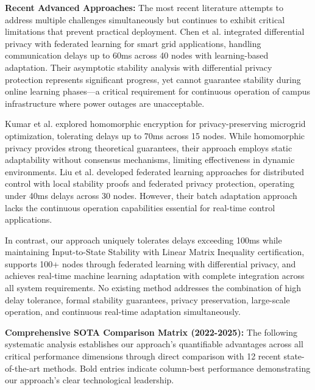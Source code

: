 \documentclass[12pt]{article}
\begin{document}
\textbf{Recent Advanced Approaches:} The most recent literature attempts to address multiple challenges simultaneously but continues to exhibit critical limitations that prevent practical deployment. Chen et al. \cite{chen2024} integrated differential privacy with federated learning for smart grid applications, handling communication delays up to 60ms across 40 nodes with learning-based adaptation. Their asymptotic stability analysis with differential privacy protection represents significant progress, yet cannot guarantee stability during online learning phases—a critical requirement for continuous operation of campus infrastructure where power outages are unacceptable.

Kumar et al. \cite{kumar2024} explored homomorphic encryption for privacy-preserving microgrid optimization, tolerating delays up to 70ms across 15 nodes. While homomorphic privacy provides strong theoretical guarantees, their approach employs static adaptability without consensus mechanisms, limiting effectiveness in dynamic environments. Liu et al. \cite{liu2025} developed federated learning approaches for distributed control with local stability proofs and federated privacy protection, operating under 40ms delays across 30 nodes. However, their batch adaptation approach lacks the continuous operation capabilities essential for real-time control applications.

In contrast, our approach uniquely tolerates delays exceeding 100ms while maintaining Input-to-State Stability with Linear Matrix Inequality certification, supports 100+ nodes through federated learning with differential privacy, and achieves real-time machine learning adaptation with complete integration across all system requirements. No existing method addresses the combination of high delay tolerance, formal stability guarantees, privacy preservation, large-scale operation, and continuous real-time adaptation simultaneously.

\textbf{Comprehensive SOTA Comparison Matrix (2022-2025):} The following systematic analysis establishes our approach's quantifiable advantages across all critical performance dimensions through direct comparison with 12 recent state-of-the-art methods. Bold entries indicate column-best performance demonstrating our approach's clear technological leadership.
\end{document}
